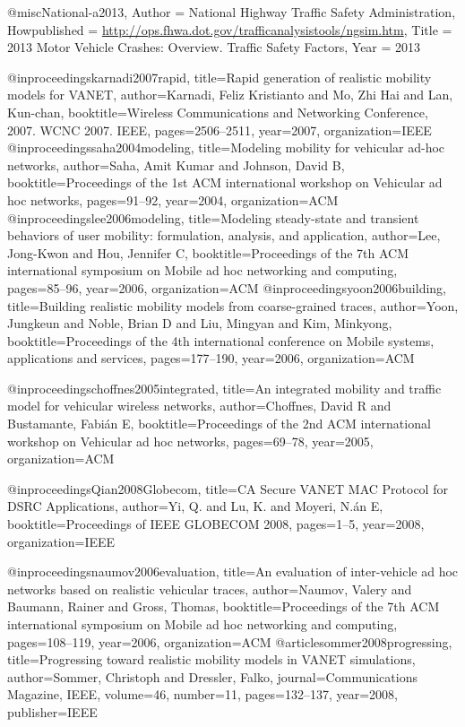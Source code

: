 {{{{@misc{National-a2013,
	Author = {National Highway Traffic Safety Administration},
	Howpublished = {\url{http://ops.fhwa.dot.gov/trafficanalysistools/ngsim.htm}},
	Title = {2013 Motor Vehicle Crashes: Overview. Traffic Safety Factors},
	Year = {2013}
}

@inproceedings{karnadi2007rapid,
	title={Rapid generation of realistic mobility models for VANET},
	author={Karnadi, Feliz Kristianto and Mo, Zhi Hai and Lan, Kun-chan},
	booktitle={Wireless Communications and Networking Conference, 2007. WCNC 2007. IEEE},
	pages={2506--2511},
	year={2007},
	organization={IEEE}
}
@inproceedings{saha2004modeling,
	title={Modeling mobility for vehicular ad-hoc networks},
	author={Saha, Amit Kumar and Johnson, David B},
	booktitle={Proceedings of the 1st ACM international workshop on Vehicular ad hoc networks},
	pages={91--92},
	year={2004},
	organization={ACM}
}
@inproceedings{lee2006modeling,
	title={Modeling steady-state and transient behaviors of user mobility: formulation, analysis, and application},
	author={Lee, Jong-Kwon and Hou, Jennifer C},
	booktitle={Proceedings of the 7th ACM international symposium on Mobile ad hoc networking and computing},
	pages={85--96},
	year={2006},
	organization={ACM}
}
@inproceedings{yoon2006building,
	title={Building realistic mobility models from coarse-grained traces},
	author={Yoon, Jungkeun and Noble, Brian D and Liu, Mingyan and Kim, Minkyong},
	booktitle={Proceedings of the 4th international conference on Mobile systems, applications and services},
	pages={177--190},
	year={2006},
	organization={ACM}
}

@inproceedings{choffnes2005integrated,
	title={An integrated mobility and traffic model for vehicular wireless networks},
	author={Choffnes, David R and Bustamante, Fabi{\'a}n E},
	booktitle={Proceedings of the 2nd ACM international workshop on Vehicular ad hoc networks},
	pages={69--78},
	year={2005},
	organization={ACM}
}

@inproceedings{Qian2008Globecom,
	title={CA Secure VANET MAC Protocol for DSRC Applications},
	author={Yi, Q. and Lu, K. and Moyeri, N.{\'a}n E},
	booktitle={Proceedings of IEEE GLOBECOM 2008},
	pages={1--5},
	year={2008},
	organization={IEEE}
}





@inproceedings{naumov2006evaluation,
	title={An evaluation of inter-vehicle ad hoc networks based on realistic vehicular traces},
	author={Naumov, Valery and Baumann, Rainer and Gross, Thomas},
	booktitle={Proceedings of the 7th ACM international symposium on Mobile ad hoc networking and computing},
	pages={108--119},
	year={2006},
	organization={ACM}
}
@article{sommer2008progressing,
	title={Progressing toward realistic mobility models in VANET simulations},
	author={Sommer, Christoph and Dressler, Falko},
	journal={Communications Magazine, IEEE},
	volume={46},
	number={11},
	pages={132--137},
	year={2008},
	publisher={IEEE}
}




}}}}
